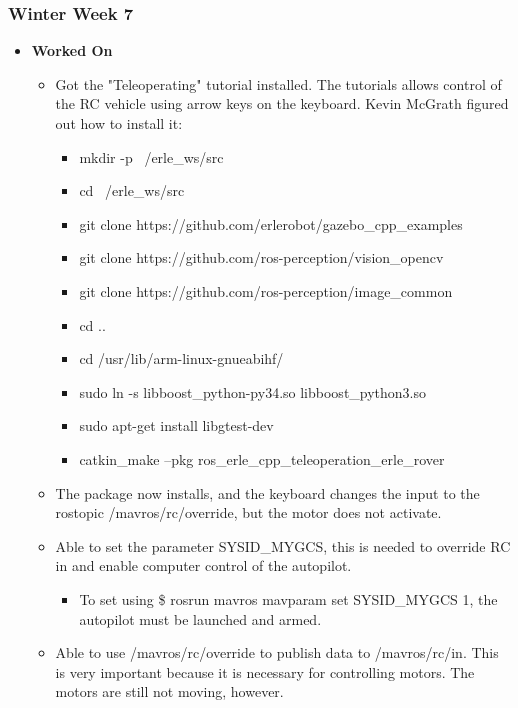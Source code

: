\documentclass{article}
\begin{document}
\subsubsection{Winter Week 7}
\begin{itemize}
    \item {\textbf{Worked On}}
    \begin{itemize}
        \item Got the "Teleoperating" tutorial installed. The tutorials allows control of the RC vehicle using arrow keys on the keyboard. Kevin McGrath figured out how to install it:
        \begin{itemize}
            \item mkdir -p ~/erle\_ws/src
            \item cd ~/erle\_ws/src
            \item git clone https://github.com/erlerobot/gazebo\_cpp\_examples
            \item git clone https://github.com/ros-perception/vision\_opencv
            \item git clone https://github.com/ros-perception/image\_common
            \item cd ..
            \item cd /usr/lib/arm-linux-gnueabihf/
            \item sudo ln -s libboost\_python-py34.so libboost\_python3.so
            \item sudo apt-get install libgtest-dev
            \item catkin\_make --pkg ros\_erle\_cpp\_teleoperation\_erle\_rover
        \end{itemize}

        \item The package now installs, and the keyboard changes the input to the rostopic /mavros/rc/override, but the motor does not activate.

        \item Able to set the parameter SYSID\_MYGCS, this is needed to override RC in and enable computer control of the autopilot.
        \begin{itemize}
            \item To set using \$ rosrun mavros mavparam set SYSID\_MYGCS 1, the autopilot must be launched and armed.
        \end{itemize}
        \item Able to use /mavros/rc/override to publish data to /mavros/rc/in. This is very important because it is necessary for controlling motors. The motors are still not moving, however.


\end{itemize}
\end{itemize}
\end{document}
